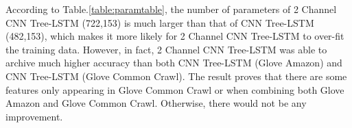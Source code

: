 According to Table.\ref{table:paramtable}, the number of parameters of 2 Channel CNN Tree-LSTM (722,153) is much larger than that of CNN Tree-LSTM (482,153), which makes it more likely for 2 Channel CNN Tree-LSTM to over-fit the training data.
However, in fact, 2 Channel CNN Tree-LSTM was able to archive much higher accuracy than both CNN Tree-LSTM (Glove Amazon) and CNN Tree-LSTM (Glove Common Crawl).\label{proved:Common-syn-Amazon}
The result proves that there are some features only appearing in Glove Common Crawl or when combining both Glove Amazon and Glove Common Crawl.
Otherwise, there would not be any improvement.
